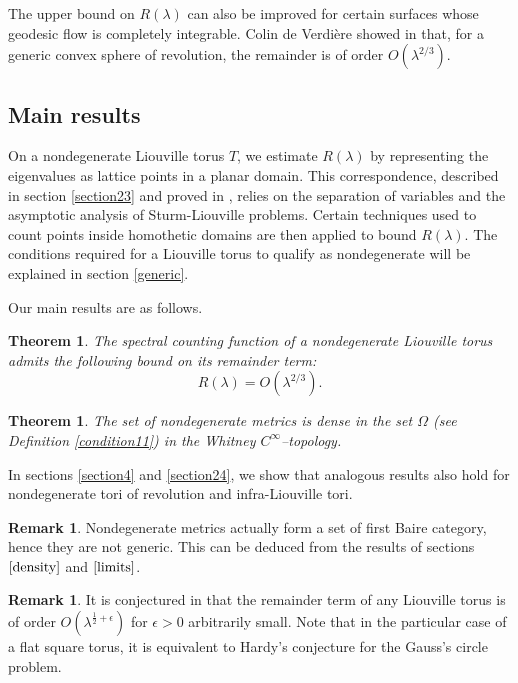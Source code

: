 \documentclass[12pt]{amsart}
\numberwithin{equation}{subsection}
\theoremstyle{definition}
\newtheorem{remark}[equation]{Remark}
\theoremstyle{plain}
\newtheorem{theorem}[equation]{Theorem}
\begin{document}
The upper bound on $R(\lambda)$ can also be improved for certain surfaces whose geodesic flow is completely integrable.
Colin de Verdi\`ere showed in \cite{4} that, for a generic
convex sphere of revolution, the remainder is of order $O(\lambda^{2/3})$.
\subsection{Main results}
On a nondegenerate Liouville torus $T$,
we estimate $R(\lambda)$ by representing the eigenvalues as lattice
points in a planar domain. This correspondence, described in section \ref{section23} and proved in \cite{1}, relies on
the separation of variables and the asymptotic analysis of Sturm-Liouville problems.
Certain techniques used to count points inside homothetic domains are then applied
to bound $R(\lambda)$. The conditions required for a Liouville torus to qualify as nondegenerate will be explained in section \ref{generic}.

Our main results are as follows.
\begin{theorem}
\label{thm1} The spectral counting function of a nondegenerate Liouville torus admits the following bound on its remainder term:
\[
R(\lambda) = O(\lambda^{2/3}).
\]
\end{theorem}

\begin{theorem}
\label{thm2} The set of nondegenerate metrics is dense in the set $\Omega$ (see Definition \ref{condition11}) in the Whitney $C^{\infty}$--topology.
\end{theorem}

In sections \ref{section4} and \ref{section24}, we show that analogous results also hold for nondegenerate tori of revolution
and infra-Liouville tori.

\begin{remark}
Nondegenerate metrics actually form a set of first Baire category, hence they are not generic.
This can be deduced from the results of sections $\ref{density}$ and $\ref{limits}$.
\end{remark}

\begin{remark}
It is conjectured in \cite{10} that the remainder term of any Liouville torus is of order $O(\lambda^{\frac{1}{2}+\epsilon})$ for $\epsilon > 0$ arbitrarily small.
Note that in the particular case of a flat square torus, it is equivalent to Hardy's conjecture for the Gauss's circle problem.
\end{remark}
\end{document}
